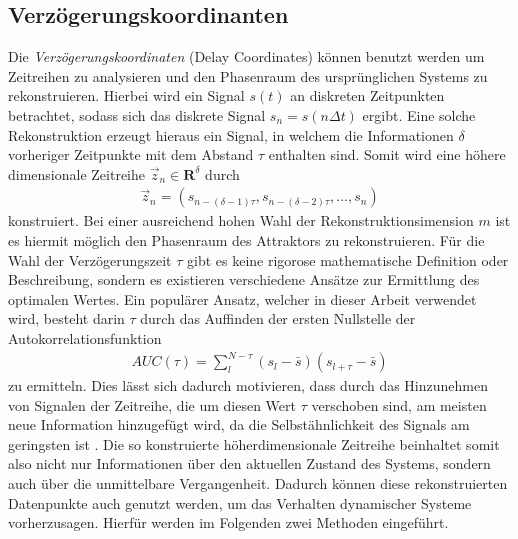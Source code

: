 \subsection{Verzögerungskoordinanten}
\label{sc:delay_reconstruction}
Die \textit{Verzögerungskoordinaten} (Delay Coordinates) können benutzt werden um Zeitreihen zu analysieren und den Phasenraum des ursprünglichen Systems zu rekonstruieren.
Hierbei wird ein Signal $s(t)$ an diskreten Zeitpunkten betrachtet, sodass sich das diskrete Signal $s_n = s(n\Delta t)$ ergibt. Eine solche Rekonstruktion erzeugt hieraus ein Signal, in welchem die Informationen $\delta$ vorheriger Zeitpunkte mit dem Abstand $\tau$ enthalten sind. Somit wird eine höhere dimensionale Zeitreihe $\vec{z}_n \in \mathbf{R}^{\delta}$ durch
\begin{align}
	\vec{z}_n = \left(s_{n-(\delta-1)\tau}, s_{n-(\delta-2)\tau}, \ldots ,s_n \right)
\end{align} 
konstruiert. Bei einer ausreichend hohen Wahl der Rekonstruktionsimension $m$ ist es hiermit möglich den Phasenraum des Attraktors zu rekonstruieren. Für die Wahl der Verzögerungszeit $\tau$ gibt es keine rigorose mathematische Definition oder Beschreibung, sondern es existieren verschiedene Ansätze zur Ermittlung des optimalen Wertes. Ein populärer Ansatz, welcher in dieser Arbeit verwendet wird, besteht darin $\tau$ durch das Auffinden der ersten Nullstelle der Autokorrelationsfunktion 
\begin{align}
AUC(\tau) = \sum_l^{N-\tau} (s_l-\bar{s})(s_{l+\tau}-\bar{s})
\end{align}   
zu ermitteln. Dies lässt sich dadurch motivieren, dass durch das Hinzunehmen von Signalen der Zeitreihe, die um diesen Wert $\tau$ verschoben sind, am meisten neue Information hinzugefügt wird, da die Selbstähnlichkeit des Signals am geringsten ist \citep[30\,ff.]{kantz2004nonlinear}.
Die so konstruierte höherdimensionale Zeitreihe beinhaltet somit also nicht nur Informationen über den aktuellen Zustand des Systems, sondern auch über die unmittelbare Vergangenheit. Dadurch können diese rekonstruierten Datenpunkte auch genutzt werden, um das Verhalten dynamischer Systeme vorherzusagen. Hierfür werden im Folgenden zwei Methoden eingeführt.